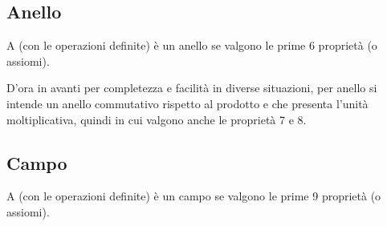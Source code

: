 \documentclass[a4paper,12pt]{article}
\newcommand{\tc}{\;\text{t.c.}\;}
\begin{document}
	\subsection{Anello}
	A (con le operazioni definite) è un anello se valgono le prime 6 proprietà (o assiomi).
	
	D'ora in avanti per completezza e facilità in diverse situazioni, per anello si intende un anello commutativo rispetto al prodotto e che presenta l'unità moltiplicativa, quindi in cui valgono anche le proprietà 7 e 8.
	
	\subsection{Campo}
	A (con le operazioni definite) è un campo se valgono le prime 9 proprietà (o assiomi).
	\begin{comment}
	\subsection{Dimostrazione proprietà}
	\begin{enumerate}
		\item Ipotesi: Sia $A$ un anello, e supponiamo che $0 \not = 0^\prime \wedge 0, 0^\prime\in A \wedge 0 + x = x \wedge 0^\prime + x = x \forall x\in A$
		\[x = x \rightarrow 0 + x = 0^\prime + x \rightarrow 0 = 0^\prime\]
		quindi lo zero è unico
		\item Assiomatica (Peano) o 
		\item Proprietà associativa della somma, quindi:
		\[z_1 + (z_2+z_3) = (z_1 + z_2) + z_3, \forall z_1,z_2,z_3\in A\]
		\item Esistenza ed unicità dell'opposto di $z \in A$, quindi:
		\[\forall z \in A \exists! w\in A \tc z + w = 0\]
		\item Proprietà associativa del prodotto, quindi:
		\[(z_1 * z_2) * z_3 = z_1 * (z_2 * z_3), \forall z_1,z_2,z_3\in A\]
		\item Proprietà distributiva del prodotto rispetto alla somma, quindi:
		\[z_1 * (z_2 + z_3) = z_1 * z_2 + z_1 * z_3 \wedge (z_1 + z_2) * z_3 = z_1 * z+3 + z_2 * z_3, \forall z_1,z_2,z_3\in A\]
		\item Proprietà commutativa rispetto al prodotto, quindi:
		\[w * z = z * w, \forall w,z \in A\]
		\item L'esistenza ed unicità dell'unità neutra del prodotto ($u \in A$) (unità moltiplicativa), diversa dall'unità neutra della somma, quindi $\not = 0$:
		\[u * x = x * u = x, \forall x \in A\]
		\item L'esistenza ed unicità dell'inverso moltiplicativo, quindi:
		\[\forall x\not = 0 \in A, \exists! w\in A \tc x * w = 1 \rightarrow w = x^{-1}\]
	\end{enumerate}
	\end{comment}
	
	
\end{document}
